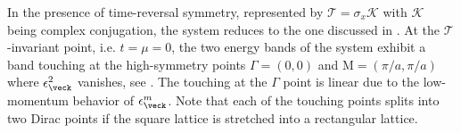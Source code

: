 In the presence of time-reversal symmetry, represented by $\mathcal{T}=\sigma_x \mathcal{K}$ with $\mathcal{K}$ being complex conjugation, the system reduces to the one discussed in .
At the $\mathcal{T}$-invariant point, i.e. $t=\mu=0$, the two energy bands of the system exhibit a band touching at the high-symmetry points $\Gamma=(0,0)$ and $\text{M}=(\pi/a, \pi/a)$ where $\epsilon^2_\veck$ vanishes, see .
The touching at the $\Gamma$ point is linear due to the low-momentum behavior of $\epsilon^m_\veck$.
Note that each of the touching points splits into two Dirac points if the square lattice is stretched into a rectangular lattice.

